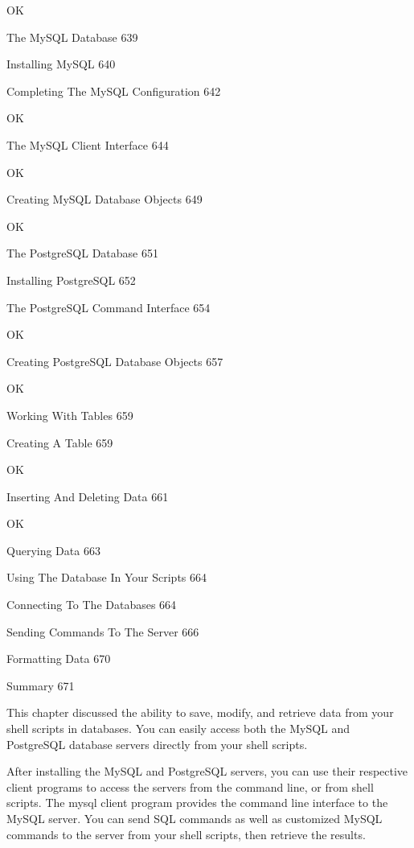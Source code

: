 OK

The MySQL Database 639



Installing MySQL 640



Completing The MySQL Configuration 642

OK

The MySQL Client Interface 644

OK

Creating MySQL Database Objects 649

OK

The PostgreSQL Database 651



Installing PostgreSQL 652



The PostgreSQL Command Interface 654

OK

Creating PostgreSQL Database Objects 657

OK

Working With Tables 659



Creating A Table 659

OK

Inserting And Deleting Data 661

OK

Querying Data 663



Using The Database In Your Scripts 664



Connecting To The Databases 664



Sending Commands To The Server 666



Formatting Data 670



Summary 671

This chapter discussed the ability to save, modify, and retrieve data from your shell scripts in databases. You can easily access both the MySQL and PostgreSQL database servers directly from your shell scripts.

After installing the MySQL and PostgreSQL servers, you can use their respective client programs to access the servers from the command line, or from shell scripts. The mysql client program provides the command line interface to the MySQL server. You can send SQL commands as well as customized MySQL commands to the server from your shell scripts, then retrieve the results.

